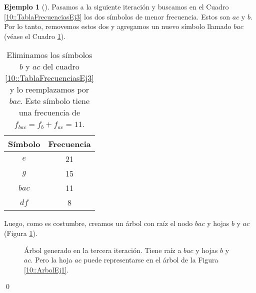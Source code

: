 \documentclass[english, spanish, fleqn, 10pt]{article}
\numberwithin{equation}{section}
\theoremstyle{definition}
\newtheorem{beforeExample}{Ejemplo}[section]
\newenvironment{ejemplo}[1][]{\begin{beforeExample}[#1]\renewcommand{\qedsymbol}{$\blacksquare$}}{\qed\end{beforeExample}}
\begin{document}
\begin{ejemplo}
	Pasamos a la siguiente iteración y buscamos en el Cuadro \ref{10::TablaFrecuenciasEj3} los dos símbolos de menor frecuencia. Estos son $ac$ y $b$. Por lo tanto, removemos estos dos y agregamos un nuevo símbolo llamado $bac$ (véase el Cuadro \ref{10::TablaFrecuenciasEj4}).
	\begin{table}[!h]
		\centering
		\begin{tabular}{c|c}
			Símbolo & Frecuencia\\
			\hline
			$e$&21\\
			$g$&15\\
			$bac$&11\\
			$df$&8
		\end{tabular}
		\caption{Eliminamos los símbolos $b$ y $ac$ del cuadro \ref{10::TablaFrecuenciasEj3} y lo reemplazamos por $bac$. Este símbolo tiene una frecuencia de $f_{bac}=f_{b}+f_{ac}=11$.}
		\label{10::TablaFrecuenciasEj4}
	\end{table}
	Luego, como es costumbre, creamos un árbol con raíz el nodo $bac$ y hojas $b$ y $ac$ (Figura \ref{10::ArbolEj3}).
	\begin{figure}[!h]
		\centering
		\caption{Árbol generado en la tercera iteración. Tiene raíz a $bac$ y hojas $b$ y $ac$. Pero la hoja $ac$ puede representarse en el árbol de la Figura \ref{10::ArbolEj1}.}
		\label{10::ArbolEj3}
	\end{figure}
	

\end{ejemplo}
\end{document}
